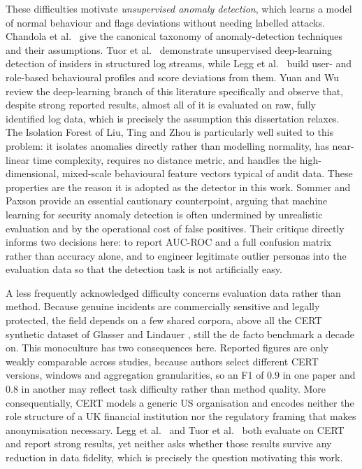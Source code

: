 \documentclass[10pt,a4paper]{article}
\begin{document}
These difficulties motivate \emph{unsupervised anomaly detection}, which learns a model of normal behaviour and flags deviations without needing labelled attacks. Chandola et al.\ \cite{chandola2009} give the canonical taxonomy of anomaly-detection techniques and their assumptions. Tuor et al.\ \cite{tuor2017} demonstrate unsupervised deep-learning detection of insiders in structured log streams, while Legg et al.\ \cite{legg2017} build user- and role-based behavioural profiles and score deviations from them. Yuan and Wu \cite{yuan2021} review the deep-learning branch of this literature specifically and observe that, despite strong reported results, almost all of it is evaluated on raw, fully identified log data, which is precisely the assumption this dissertation relaxes. The Isolation Forest of Liu, Ting and Zhou \cite{isoforest2008} is particularly well suited to this problem: it isolates anomalies directly rather than modelling normality, has near-linear time complexity, requires no distance metric, and handles the high-dimensional, mixed-scale behavioural feature vectors typical of audit data. These properties are the reason it is adopted as the detector in this work. Sommer and Paxson \cite{sommer2010} provide an essential cautionary counterpoint, arguing that machine learning for security anomaly detection is often undermined by unrealistic evaluation and by the operational cost of false positives. Their critique directly informs two decisions here: to report AUC-ROC and a full confusion matrix rather than accuracy alone, and to engineer legitimate outlier personas into the evaluation data so that the detection task is not artificially easy.

A less frequently acknowledged difficulty concerns evaluation data rather than method. Because genuine incidents are commercially sensitive and legally protected, the field depends on a few shared corpora, above all the CERT synthetic dataset of Glasser and Lindauer \cite{glasser2013}, still the de facto benchmark a decade on. This monoculture has two consequences here. Reported figures are only weakly comparable across studies, because authors select different CERT versions, windows and aggregation granularities, so an F1 of $0.9$ in one paper and $0.8$ in another may reflect task difficulty rather than method quality. More consequentially, CERT models a generic US organisation and encodes neither the role structure of a UK financial institution nor the regulatory framing that makes anonymisation necessary. Legg et al.\ \cite{legg2017} and Tuor et al.\ \cite{tuor2017} both evaluate on CERT and report strong results, yet neither asks whether those results survive any reduction in data fidelity, which is precisely the question motivating this work.
\end{document}
